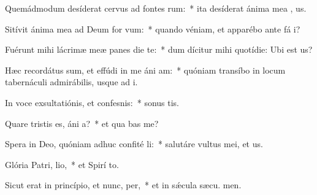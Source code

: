 \item Quemádmodum desíderat cervus ad fontes rum:~* ita desíderat ánima mea  , us.
\item Sitívit ánima mea ad Deum for vum:~* quando véniam, et apparébo ante fá i?
\item Fuérunt mihi lácrimæ meæ panes die  te:~* dum dícitur mihi quotídie: Ubi est  us?
\item Hæc recordátus sum, et effúdi in me áni am:~* quóniam transíbo in locum tabernáculi admirábilis, usque ad  i.
\item In voce exsultatiónis, et confesnis:~* sonus tis.
\item Quare tristis es, áni a?~* et qua bas me?
\item Spera in Deo, quóniam adhuc confité li:~* salutáre vultus mei, et  us.
\item Glória Patri,  lio,~* et Spirí to.
\item Sicut erat in princípio, et nunc,  per,~* et in sǽcula sæcu. men.
